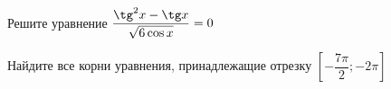 \begin{ex}
	\begin{condition}
		\begin{enumcols}[label=\asbuk*)]
			\item Решите уравнение \( \dfrac{\tg^2 x -\tg x}{\sqrt{6\cos x}} = 0 \)
			\item Найдите все корни уравнения, принадлежащие отрезку \( \left[-\dfrac{7\pi}{2};-2\pi\right] \)
		\end{enumcols}
	\end{condition}
\end{ex}